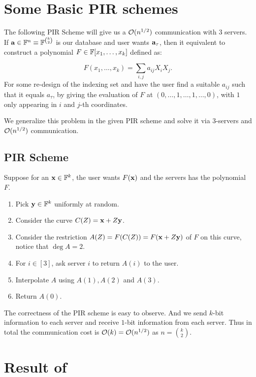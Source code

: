 \section{Some Basic PIR schemes}\label{sec:basic-pir}

The following PIR Scheme will give us a $\mathcal{O}(n^{1/2})$ communication with $3$ servers. If $\mathbf{a}\in\mathbb{F}^n \equiv \mathbb{F}^{\binom{k}{2}}$ is our database and user wants $\mathbf{a}_{\tau}$, then it equivalent to construct a polynomial $F\in\mathbb{F}[x_1,\ldots,x_k]$ defined as:

\[
    F(x_1,\ldots, x_k) = \sum_{i,j} a_{ij}X_iX_j.
\]
For some re-design of the indexing set and have the user find a suitable $a_{ij}$ such that it equals $a_{\tau}$, by giving the evaluation of $F$ at $(0,\ldots,1,\ldots,1,\ldots,0)$, with $1$ only appearing in $i$ and $j$-th coordinates. 

We generalize this problem in the given PIR scheme and solve it via $3$-servers and $\mathcal{O}(n^{1/2})$ communication.

\subsection*{PIR Scheme}

Suppose for an $\mathbf{x}\in\mathbb{F}^k$, the user wants $F(\mathbf{x})$ and the servers has the polynomial $F$. 

\begin{enumerate}
    \item Pick $\mathbf{y}\in\mathbb{F}^k$ uniformly at random. 
    \item Consider the curve $C(Z) = \mathbf{x} + Z\mathbf{y}$.
    \item Consider the restriction $A(Z) = F(C(Z)) = F(\mathbf{x} + Z\mathbf{y})$ of $F$ on this curve, notice that $\deg A = 2$. 
    \item For $i\in[3]$, ask server $i$ to return $A(i)$ to the user.
    \item Interpolate $A$ using $A(1), A(2)$ and $A(3)$.
    \item Return $A(0)$.
\end{enumerate}

The correctness of the PIR scheme is easy to observe. And we send $k$-bit information to each server and receive $1$-bit information from each server. Thus in total the communication cost is $\mathcal{O}(k) = \mathcal{O}(n^{1/2})$ as $n = \binom{k}{2}$.

\section{Result of \cite{efr09}}

